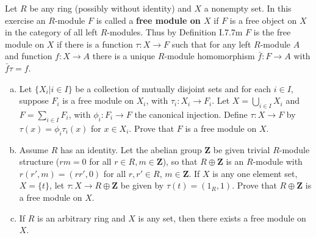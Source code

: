 $$ $$

\begin{ex}
    Let $R$ be any ring (possibly without identity) and $X$ a nonempty set. In this exercise an $R$-module $F$ is called a \textbf{free module on $X$} if $F$ is a free object on $X$ in the category of all left $R$-modules. Thus by Definition I.7.7m $F$ is the free module on $X$ if there is a function $\tau:X\to F$ such that for any left $R$-module $A$ and function $f:X\to A$ there is a unique $R$-module homomorphism $\bar{f}:F\to A$ with $\bar{f}\tau=f$.
    \begin{enumerate}[(a)]
        \item Let $\{X_{i}|i\in I\}$ be a collection of mutually disjoint sets and for each $i\in I$, suppose $F_{i}$ is a free module on $X_{i}$, with $\tau_{i}:X_{i}\to F_{i}$. Let $X=\bigcup\limits_{i\in I}X_{i}$ and $F=\sum\limits_{i\in I}F_{i}$, with $\phi_{i}:F_{i}\to F$ the canonical injection. Define $\tau:X\to F$ by $\tau(x)=\phi_{i}\tau_{i}(x)$ for $x\in X_{i}$. Prove that $F$ is a free module on $X$.
        \item Assume $R$ has an identity. Let the abelian group $\mathbf{Z}$ be given trivial $R$-module structure ($rm=0$ for all $r\in R, m\in\mathbf{Z}$), so that $R\oplus\mathbf{Z}$ is an $R$-module with $r(r',m)=(rr',0)$ for all $r,r'\in R$, $m\in \mathbf{Z}$. If $X$ is any one element set, $X=\{t\}$, let $\tau:X\to R\oplus\mathbf{Z}$ be given by $\tau(t)=(1_{R},1)$. Prove that $R\oplus\mathbf{Z}$ is a free module on $X$.
        \item If $R$ is an arbitrary ring and $X$ is any set, then there exists a free module on $X$.
    \end{enumerate}
\end{ex}

